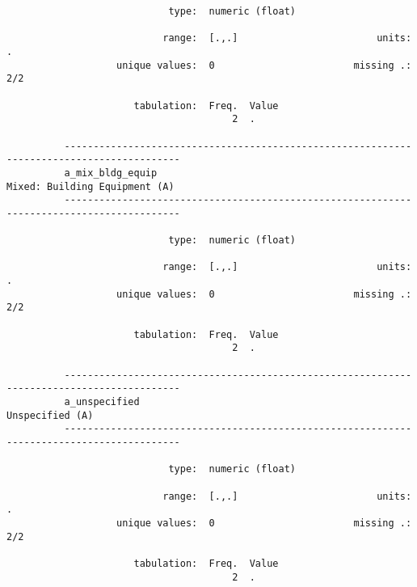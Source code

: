 \documentclass{article}
\begin{document}
\begin{verbatim}
                            type:  numeric (float)
          
                           range:  [.,.]                        units:  .
                   unique values:  0                        missing .:  2/2
          
                      tabulation:  Freq.  Value
                                       2  .
          
          ------------------------------------------------------------------------------------------
          a_mix_bldg_equip                                             Mixed: Building Equipment (A)
          ------------------------------------------------------------------------------------------
          
                            type:  numeric (float)
          
                           range:  [.,.]                        units:  .
                   unique values:  0                        missing .:  2/2
          
                      tabulation:  Freq.  Value
                                       2  .
          
          ------------------------------------------------------------------------------------------
          a_unspecified                                                              Unspecified (A)
          ------------------------------------------------------------------------------------------
          
                            type:  numeric (float)
          
                           range:  [.,.]                        units:  .
                   unique values:  0                        missing .:  2/2
          
                      tabulation:  Freq.  Value
                                       2  .
          
          
\end{verbatim}
\end{document}
